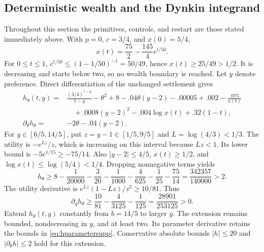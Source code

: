 \subsection{Deterministic wealth and the Dynkin integrand}
Throughout this section the primitives, controls, and restart are those stated immediately above. With $p=0$, $c=3/4$, and $x(0)=5/4$,
\begin{equation}
 x(t)=\frac{75}{2}-\frac{145}{4}e^{t/50}.
\end{equation}
For $0\le t\le1$, $e^{t/50}\le(1-1/50)^{-1}=50/49$, hence $x(t)\ge25/49>1/2$. It is decreasing and starts below two, so no wealth boundary is reached. Let $y$ denote preference. Direct differentiation of the unchanged settlement gives
\begin{align}
 h_\theta(t,y)={}&\frac{(3/4)^{1-y}}{1-y}-\theta^2+8
 -.04\theta(y-2)-.00005+.002-\frac{.075}{x(t)}\nonumber\\
 &\quad+.0008(y-2)^2-.004\log x(t)+.32(1-t),\label{eq:hsupp}\\
 \partial_\theta h_\theta={}&-2\theta-.04(y-2).\label{eq:hparametersupp}
\end{align}
For $y\in[6/5,14/5]$, put $z=y-1\in[1/5,9/5]$ and $L=\log(4/3)<1/3$. The utility is $-e^{Lz}/z$, which is increasing on this interval because $Lz<1$. Its lower bound is $-5e^{1/15}\ge-75/14$. Also $|y-2|\le4/5$, $x(t)\ge1/2$, and $\log x(t)\le\log(5/4)<1/4$. Dropping nonnegative terms yields
\begin{equation}
 h_\theta\ge8-\frac1{20000}-\frac3{20}-\frac1{1000}
 -\frac4{625}-\frac1{25}-\frac{75}{14}
 =\frac{342357}{140000}>2.\label{eq:hlower}
\end{equation}
The utility derivative is $e^{Lz}(1-Lz)/z^2\ge10/81$. Thus
\begin{equation}
 \partial_yh_\theta\ge\frac{10}{81}-\frac4{3125}-\frac1{125}
 =\frac{28901}{253125}>0.\label{eq:hylower}
\end{equation}
Extend $h_\theta(t,y)$ constantly from $b=14/5$ to larger $y$. The extension remains bounded, nondecreasing in $y$, and at least two. Its parameter derivative retains the bounds in \eqref{eq:hparametersupp}. Conservative absolute bounds $|h|\le20$ and $|\partial_\theta h|\le2$ hold for this extension.

